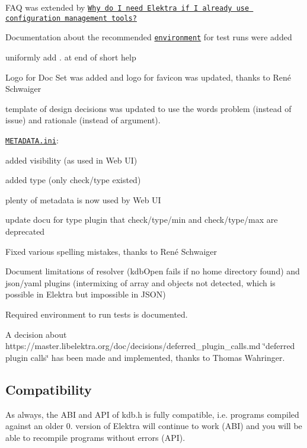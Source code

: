 \begin{DoxyItemize}
\item F\+AQ was extended by \href{https://www.libelektra.org/docgettingstarted/faq}{\tt Why do I need Elektra if I already use configuration management tools?}
\item Documentation about the recommended \href{https://www.libelektra.org/devgettingstarted/testing}{\tt environment} for test runs were added
\item uniformly add {\ttfamily .} at end of short help
\item Logo for Doc Set was added and logo for favicon was updated, thanks to René Schwaiger
\item template of design decisions was updated to use the words problem (instead of issue) and rationale (instead of argument).
\item \href{https://www.libelektra.org/docgettingstarted/meta-specification}{\tt M\+E\+T\+A\+D\+A\+T\+A.\+ini}\+:
\begin{DoxyItemize}
\item added visibility (as used in Web UI)
\item added type (only check/type existed)
\item plenty of metadata is now used by Web UI
\end{DoxyItemize}
\item update docu for type plugin that {\ttfamily check/type/min} and {\ttfamily check/type/max} are deprecated
\item Fixed various spelling mistakes, thanks to René Schwaiger
\item Document limitations of resolver (kdb\+Open fails if no home directory found) and json/yaml plugins (intermixing of array and objects not detected, which is possible in Elektra but impossible in J\+S\+ON)
\item Required environment to run tests is documented.
\item A decision about https\+://master.libelektra.\+org/doc/decisions/deferred\+\_\+plugin\+\_\+calls.md \char`\"{}deferred plugin calls\char`\"{} has been made and implemented, thanks to Thomas Wahringer.
\end{DoxyItemize}

\subsection*{Compatibility}

As always, the A\+BI and A\+PI of kdb.\+h is fully compatible, i.\+e. programs compiled against an older 0. version of Elektra will continue to work (A\+BI) and you will be able to recompile programs without errors (A\+PI).

